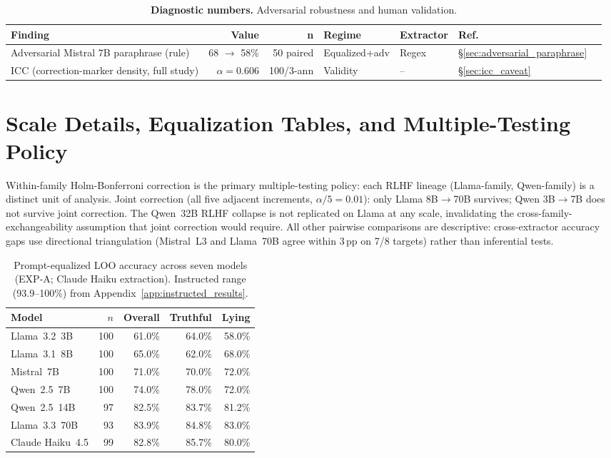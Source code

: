 \begin{table}[h]
\centering
\setlength{\tabcolsep}{4pt}
\caption{\textbf{Diagnostic numbers.} Adversarial robustness and human validation.}
\label{tab:headlines_diagnostics}
\begin{small}
\begin{tabular}{lrrllll}
\toprule
\textbf{Finding} & \textbf{Value} & \textbf{n} & \textbf{Regime} & \textbf{Extractor} & \textbf{Ref.} \\
\midrule
Adversarial Mistral 7B paraphrase (rule) & 68 $\to$ 58\% & 50 paired & Equalized+adv & Regex & \S\ref{sec:adversarial_paraphrase} \\
ICC (correction-marker density, full study) & $\alpha\!=\!0.606$ & 100/3-ann & Validity & -- & \S\ref{sec:icc_caveat} \\
\bottomrule
\end{tabular}
\end{small}
\end{table}


\section{Scale Details, Equalization Tables, and Multiple-Testing Policy}\label{app:scale_details}\label{app:stats_policy}

Within-family Holm-Bonferroni correction is the primary multiple-testing policy: each RLHF lineage (Llama-family, Qwen-family) is a distinct unit of analysis. Joint correction (all five adjacent increments, $\alpha/5=0.01$): only Llama 8B$\to$70B survives; Qwen 3B$\to$7B does not survive joint correction. The Qwen~32B RLHF collapse is not replicated on Llama at any scale, invalidating the cross-family-exchangeability assumption that joint correction would require. All other pairwise comparisons are descriptive: cross-extractor accuracy gaps use directional triangulation (Mistral~L3 and Llama~70B agree within 3\,pp on 7/8 targets) rather than inferential tests.

\begin{table}[h]
\centering
\caption{Prompt-equalized LOO accuracy across seven models (EXP-A; Claude Haiku extraction). Instructed range (93.9--100\%) from Appendix~\ref{app:instructed_results}.}
\label{tab:prompt_equalized}
\begin{tabular}{lrrrr}
\toprule
\textbf{Model} & \textbf{$n$} & \textbf{Overall} & \textbf{Truthful} & \textbf{Lying} \\
\midrule
Llama~3.2~3B     & 100 & 61.0\% & 64.0\% & 58.0\% \\
Llama~3.1~8B     & 100 & 65.0\% & 62.0\% & 68.0\% \\
Mistral~7B       & 100 & 71.0\% & 70.0\% & 72.0\% \\
Qwen~2.5~7B      & 100 & 74.0\% & 78.0\% & 72.0\% \\
Qwen~2.5~14B     &  97 & 82.5\% & 83.7\% & 81.2\% \\
Llama~3.3~70B    &  93 & 83.9\% & 84.8\% & 83.0\% \\
Claude Haiku~4.5 &  99 & 82.8\% & 85.7\% & 80.0\% \\
\bottomrule
\end{tabular}
\end{table}

